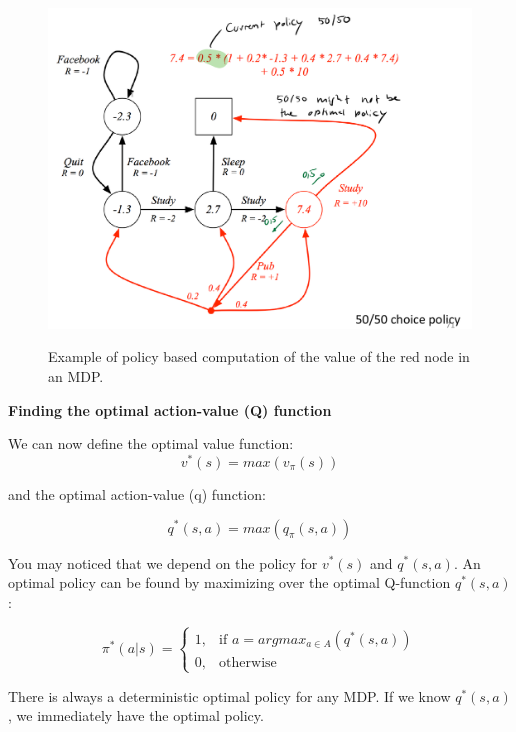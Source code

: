 \documentclass[main]{subfiles}
\begin{document}
\begin{figure}[H]
	\centering
	\includegraphics[width=0.9\linewidth]{08_ReinforcementLearning/figures/bellmann-mdp.png}
	\label{fig:mrp-example}
	\caption{Example of policy based computation of the value of the red node in an MDP.}
\end{figure}

\textbf{Finding the optimal action-value (Q) function}

We can now define the optimal value function:
\begin{equation}
    v^*(s) = max (v_\pi(s))
\end{equation}

and the optimal action-value (q) function:

\begin{equation}
    q^*(s,a) = max (q_\pi(s,a))
\end{equation}

You may noticed that we depend on the policy for  $v^*(s)$ and $q^*(s,a)$.
An optimal policy can be found by maximizing over the optimal Q-function $q^*(s,a)$:

\begin{equation*}

\pi^*(a|s) =     
\begin{cases}
    1, & \text{if } a = argmax_{a \in A}(q^*(s,a)) \\
    0, & \text{otherwise}
\end{cases}
    
\end{equation*}


There is always a deterministic optimal policy for any MDP.
If we know $q^*(s,a)$, we immediately have the optimal policy.
\end{document}
